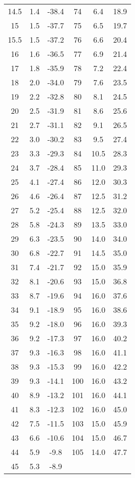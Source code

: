 \begin{table}[H]
\begin{tabular}{  ccc|ccc }
14.5& 1.4& -38.4&74& 6.4& 18.9\\
15 &1.5 &-37.7&75 &6.5 &19.7\\
15.5& 1.5& -37.2&76& 6.6& 20.4\\
16 &1.6 &-36.5&77 &6.9 &21.4\\
17 &1.8 &-35.9&78 &7.2 &22.4\\
18 &2.0 &-34.0&79 &7.6 &23.5\\
19 &2.2 &-32.8&80 &8.1 &24.5\\
20 &2.5 &-31.9&81 &8.6 &25.6\\
21 &2.7 &-31.1&82 &9.1 &26.5\\
22 &3.0 &-30.2&83 &9.5 &27.4\\
23 &3.3 &-29.3&84 &10.5& 28.3\\
24 &3.7 &-28.4&85 &11.0 &29.3\\
25 &4.1 &-27.4&86 &12.0 &30.3\\
26 &4.6 &-26.4&87 &12.5& 31.2\\
27 &5.2 &-25.4&88 &12.5 &32.0\\
28 &5.8 &-24.3&89 &13.5 &33.0\\
29 &6.3 &-23.5&90 &14.0 &34.0\\
30 &6.8 &-22.7&91 &14.5 &35.0\\
31 &7.4 &-21.7&92 &15.0 &35.9\\
32 &8.1 &-20.6&93 &15.0 &36.8\\
33 &8.7 &-19.6&94 &16.0 &37.6\\
34 &9.1 &-18.9&95 &16.0 &38.6\\
35 &9.2 &-18.0&96 &16.0 &39.3\\
36 &9.2 &-17.3&97 &16.0 &40.2\\
37 &9.3 &-16.3&98 &16.0 &41.1\\
38 &9.3 &-15.3&99 &16.0 &42.2\\
39 &9.3 &-14.1&100& 16.0& 43.2\\
40 &8.9 &-13.2&101 &16.0 &44.1\\
41 &8.3 &-12.3&102 &16.0 &45.0\\
42 &7.5 &-11.5&103 &15.0 &45.9\\
43 &6.6 &-10.6&104 &15.0 &46.7\\
44 &5.9 &-9.8&105 &14.0 &47.7\\
45 &5.3 &-8.9& & &\\

\bottomrule
\end{tabular}
\label{tab:LABEL}
\end{table}